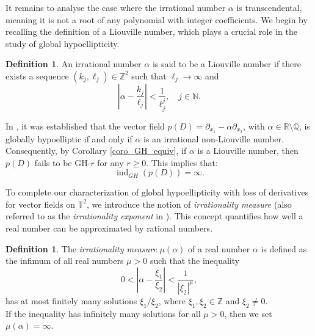 \documentclass[11pt]{amsart}
\numberwithin{equation}{section}
\theoremstyle{definition}
\newtheorem{definition}[theorem]{Definition}
\begin{document}
	It remains to analyse the case where the irrational number  \( \alpha \) is transcendental, meaning it is not a root of any polynomial with integer coefficients. We begin by recalling the definition of a Liouville number, which plays a crucial role in the study of global hypoellipticity.
	
	\begin{definition}\label{Liouv-number}
		An irrational number \( \alpha \) is said to be a Liouville number if there exists a sequence \( (k_j, \ell_j) \in \mathbb{Z}^2 \) such that \( \ell_j \to \infty \) and
		\begin{equation*}
			\left| \alpha - \frac{k_j}{\ell_j} \right| < \frac{1}{\ell_j^j}, \quad j \in \mathbb{N}.
		\end{equation*}
	\end{definition}
	
	In \cite{GW1972_pams}, it was established that the vector field \( p(D) = \partial_{x_1} - \alpha \partial_{x_2} \), with \( \alpha \in \mathbb{R} \setminus \mathbb{Q} \), is globally hypoelliptic if and only if \( \alpha \) is an irrational non-Liouville number. Consequently, by Corollary \ref{coro_GH_equiv}, if \( \alpha \) is a Liouville number, then \( p(D) \) fails to be GH-\( r \) for any \( r \geq 0 \). This implies that:
	\[
	\operatorname{ind}_{GH}(p(D)) = \infty.
	\]

    
	To complete our characterization of global hypoellipticity with loss of derivatives for vector fields on \( \mathbb{T}^2 \), we introduce the notion of \textit{irrationality measure} (also referred to as the \textit{irrationality exponent} in \cite[Appendix E]{Bugeaud_2012}). This concept quantifies how well a real number can be approximated by rational numbers.
	
	\begin{definition}
		The \textit{irrationality measure} \( \mu(\alpha) \) of a real number \( \alpha \) is defined as the infimum of all real numbers \( \mu > 0 \) such that the inequality
		\[
		0 < \left| \alpha - \frac{\xi_1}{\xi_2} \right| < \frac{1}{|\xi_2|^\mu},
		\]
		has at most finitely many solutions \( \xi_1 / \xi_2 \), where \( \xi_1, \xi_2 \in \mathbb{Z} \) and \( \xi_2 \neq 0 \).\\
		If the inequality has infinitely many solutions for all \( \mu > 0 \), then we set \( \mu(\alpha) = \infty \).
	\end{definition}
\end{document}
